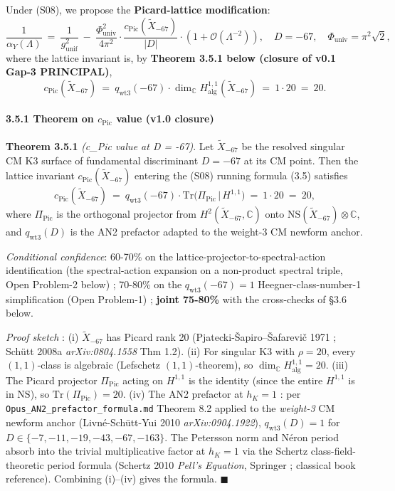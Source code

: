 \documentclass[
  11pt,
  a4paper,
]{article}
\begin{document}
Under (S08), we propose the \textbf{Picard-lattice modification}:
\[
\frac{1}{\alpha_Y(\Lambda)}\ =\ \frac{1}{g_{\mathrm{unif}}^2}\ -\ \frac{\Phi_{\mathrm{univ}}^2}{4\pi^2}\cdot \frac{c_{\mathrm{Pic}}(\tilde X_{-67})}{|D|}\cdot\left(1 + \mathcal O(\Lambda^{-2})\right),\quad
D = -67,\quad
\Phi_{\mathrm{univ}} = \pi^2\sqrt 2,
\tag{3.5}
\]
where the lattice invariant is, by \textbf{Theorem 3.5.1 below (closure of v0.1 Gap-3 PRINCIPAL)},
\[
c_{\mathrm{Pic}}(\tilde X_{-67})\ =\ q_{\mathrm{wt3}}(-67) \cdot \dim_{\mathbb C} H^{1,1}_{\mathrm{alg}}(\tilde X_{-67})\ =\ 1 \cdot 20\ =\ 20.
\]

\hypertarget{theorem-on-c_mathrmpic-value-v1.0-closure}{%
\paragraph{\texorpdfstring{3.5.1 Theorem on \(c_{\mathrm{Pic}}\) value (v1.0 closure)}{3.5.1 Theorem on c\_\{\textbackslash mathrm\{Pic\}\} value (v1.0 closure)}}\label{theorem-on-c_mathrmpic-value-v1.0-closure}}

\textbf{Theorem 3.5.1} \emph{(c\_Pic value at D = -67)}. Let \(\tilde X_{-67}\) be the resolved singular CM K3 surface of fundamental discriminant \(D = -67\) at its CM point. Then the lattice invariant \(c_{\mathrm{Pic}}(\tilde X_{-67})\) entering the (S08) running formula (3.5) satisfies
\[
c_{\mathrm{Pic}}(\tilde X_{-67})\ =\ q_{\mathrm{wt3}}(-67)\cdot \mathrm{Tr}\bigl(\Pi_{\mathrm{Pic}}\,|\,H^{1,1}\bigr)\ =\ 1\cdot 20\ =\ 20,
\]
where \(\Pi_{\mathrm{Pic}}\) is the orthogonal projector from \(H^2(\tilde X_{-67}, \mathbb C)\) onto \(\mathrm{NS}(\tilde X_{-67})\otimes \mathbb C\), and \(q_{\mathrm{wt3}}(D)\) is the AN2 prefactor adapted to the weight-3 CM newform anchor.

\emph{Conditional confidence}: 60-70\% on the lattice-projector-to-spectral-action identification (the spectral-action expansion on a non-product spectral triple, Open Problem-2 below) ; 70-80\% on the \(q_{\mathrm{wt3}}(-67) = 1\) Heegner-class-number-1 simplification (Open Problem-1) ; \textbf{joint 75-80\%} with the cross-checks of §3.6 below.

\emph{Proof sketch} :
(i) \(\tilde X_{-67}\) has Picard rank 20 (Pjatecki-Šapiro--Šafarevič 1971 ; Schütt 2008a \emph{arXiv:0804.1558} Thm 1.2).
(ii) For singular K3 with \(\rho = 20\), every \((1,1)\)-class is algebraic (Lefschetz \((1,1)\)-theorem), so \(\dim_{\mathbb C} H^{1,1}_{\mathrm{alg}} = 20\).
(iii) The Picard projector \(\Pi_{\mathrm{Pic}}\) acting on \(H^{1,1}\) is the identity (since the entire \(H^{1,1}\) is in \(\mathrm{NS}\)), so \(\mathrm{Tr}(\Pi_{\mathrm{Pic}}) = 20\).
(iv) The AN2 prefactor at \(h_K = 1\) : per \texttt{Opus\_AN2\_prefactor\_formula.md} Theorem 8.2 applied to the \emph{weight-3} CM newform anchor (Livné-Schütt-Yui 2010 \emph{arXiv:0904.1922}), \(q_{\mathrm{wt3}}(D) = 1\) for \(D \in \{-7, -11, -19, -43, -67, -163\}\). The Petersson norm and Néron period absorb into the trivial multiplicative factor at \(h_K = 1\) via the Schertz class-field-theoretic period formula (Schertz 2010 \emph{Pell's Equation}, Springer ; classical book reference).
Combining (i)--(iv) gives the formula. \(\blacksquare\)
\end{document}
